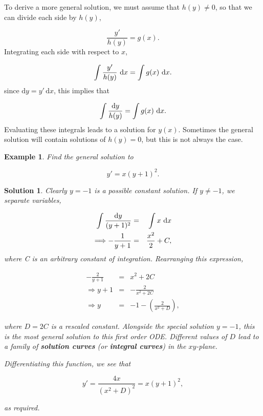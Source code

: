 \documentclass[a4paper]{report}
\newtheorem{example}{Example}[chapter]
\newtheorem*{solution}{Solution}
\begin{document}
To derive a more general solution, we must assume that $h(y)\neq0$, so that we can divide each side by $h(y)$,

\begin{displaymath}
\frac{y'}{h(y)}=g(x).
\end{displaymath}
\noindent Integrating each side with respect to $x$,

\begin{displaymath}
\int \frac{y'}{h(y)}~{\rm d} x=\int g(x)~{\rm d}x.
\end{displaymath}
\noindent since $\mathrm{d}y=y'\,\mathrm{d}x$, this implies that

\begin{equation}
\label{eqn:first:sepsolution}
\int \frac{{\rm d}y}{h(y)}=\int g(x)~{\rm d}x.
\end{equation}
\noindent Evaluating these integrals leads to a solution for $y(x)$. Sometimes the general solution will contain solutions of $h(y)=0$, but this is not always the case.

\begin{example}
\label{ex:first:separable1}
Find the general solution to 

\begin{displaymath}
y'=x(y+1)^2.
\end{displaymath}
\end{example}

\begin{solution}
Clearly $y=-1$ is a possible constant solution. If $y\neq -1$, we separate variables,

\begin{eqnarray*}
\int \frac{{\rm d}y}{(y+1)^2}&=&\int x~{\rm d}x\\
\Longrightarrow -\frac{1}{y+1} &=& \frac{x^2}{2} + C,
\end{eqnarray*}
\noindent where C is an arbitrary constant of integration. Rearranging this expression,

\begin{eqnarray*}
-\frac{2}{y+1} &=& x^2+2C\\
\Longrightarrow y+1 &=& -\frac{2}{x^2+2C}\\
\Longrightarrow y &=& -1 - \left(\frac{2}{x^2+D}\right),
\end{eqnarray*}  

\noindent where $D=2C$ is a rescaled constant. Alongside the special solution $y=-1$, this is the most general solution to this first order ODE. Different values of $D$ lead to a family of {\bf solution curves} (or {\bf integral curves}) in the $xy$-plane. \\

\par {} Differentiating this function, we see that 

\begin{displaymath}
y' = \frac{4x}{\left(x^2+D\right)^2} = x(y+1)^2,
\end{displaymath}

\noindent as required.\\


 
\end{solution}
\end{document}
